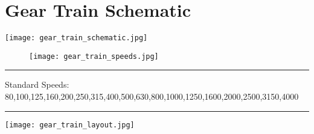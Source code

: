 \section{Gear Train Schematic}
\setcounter{section}{10}
\begin{minipage}{\textwidth}
    \begin{adjustwidth}{-2cm}{-3cm}
        \centering
        \texttt{[image: gear\_train\_schematic.jpg]}
    \end{adjustwidth}
    \label{fig:gear_train}
\end{minipage}


\vspace{-.5cm}

\begin{figure}[h]
    \centering
    \texttt{[image: gear\_train\_speeds.jpg]}
\end{figure}

\noindent \rule{1.08\textwidth}{0.5pt}
\footnotesize Standard Speeds: 80,100,125,160,200,250,315,400,500,630,800,1000,1250,1600,2000,2500,3150,4000
\rule{1.08\textwidth}{0.5pt}

\vspace{.5cm}

\texttt{[image: gear\_train\_layout.jpg]}
